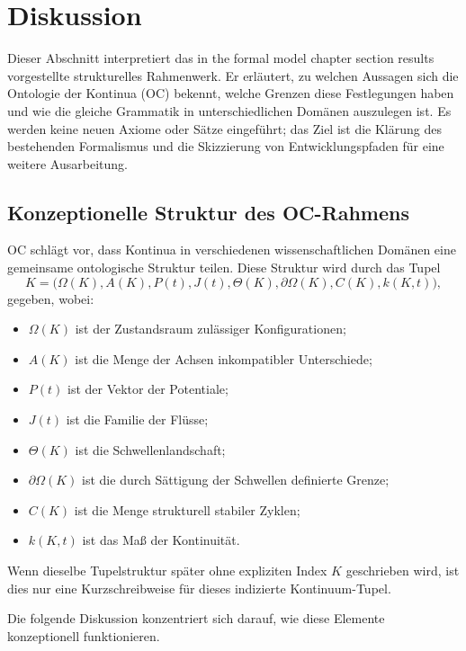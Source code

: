 
\section{Diskussion}
\label{sec:discussion}

Dieser Abschnitt interpretiert das in the formal model chapter section results vorgestellte
strukturelles Rahmenwerk. Er erläutert, zu welchen Aussagen sich die Ontologie
der Kontinua (OC) bekennt, welche Grenzen diese Festlegungen haben und wie die
gleiche Grammatik in unterschiedlichen Domänen auszulegen ist.
Es werden keine neuen Axiome oder Sätze eingeführt; das Ziel ist die
Klärung des bestehenden Formalismus und die Skizzierung von Entwicklungspfaden
für eine weitere Ausarbeitung.

\subsection{Konzeptionelle Struktur des OC-Rahmens}

OC schlägt vor, dass Kontinua in verschiedenen wissenschaftlichen Domänen eine
gemeinsame ontologische Struktur teilen.
Diese Struktur wird durch das Tupel
\[
  K = \big(\Omega(K), A(K), P(t), J(t), \Theta(K), \partial\Omega(K), C(K), k(K,t)\big),
\]
gegeben, wobei:
\begin{itemize}
    \item \(\Omega(K)\) ist der Zustandsraum zulässiger Konfigurationen;
    \item \(A(K)\) ist die Menge der Achsen inkompatibler Unterschiede;
    \item \(P(t)\) ist der Vektor der Potentiale;
    \item \(J(t)\) ist die Familie der Flüsse;
    \item \(\Theta(K)\) ist die Schwellenlandschaft;
    \item \(\partial\Omega(K)\) ist die durch Sättigung der Schwellen definierte
          Grenze;
    \item \(C(K)\) ist die Menge strukturell stabiler Zyklen;
    \item \(k(K,t)\) ist das Maß der Kontinuität.
\end{itemize}
Wenn dieselbe Tupelstruktur später ohne expliziten Index \(K\) geschrieben
wird, ist dies nur eine Kurzschreibweise für dieses indizierte
Kontinuum-Tupel.

Die folgende Diskussion konzentriert sich darauf, wie diese Elemente
konzeptionell funktionieren.

